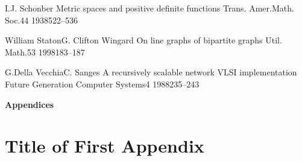 \documentclass[12pt,a4paper,titlepage,openany]{report}
\begin{document}
\begin{thebibliography}{99}
\articleInJournalOneAuthor
    {I.J. Schonber}
    {Metric spaces and positive definite functions}
   {Trans. Amer.Math. Soc.}{44}
   {1938}{522--536}


  \articleInJournalManyAuthors
    {William Staton}{G. Clifton Wingard}
    {On line graphs of bipartite graphs}
   {Util. Math.}{53}
   {1998}{183--187}      
   
  \articleInJournalManyAuthors
    {G.Della Vecchia}{C. Sanges}
    {A recursively scalable network VLSI implementation}
   {Future Generation Computer Systems}{4}
   {1988}{235--243}    
        
\end{thebibliography}
\newpage


\pagestyle{fancyplain}
\vspace*{\fill}
     \begin{center}
          \bf{\Huge{Appendices}}
     \end{center}
\vspace*{\fill}
\thispagestyle{fancy}

\appendix
\thispagestyle{empty}

\chapter{Title of First Appendix}
\thispagestyle{empty}
\end{document}
